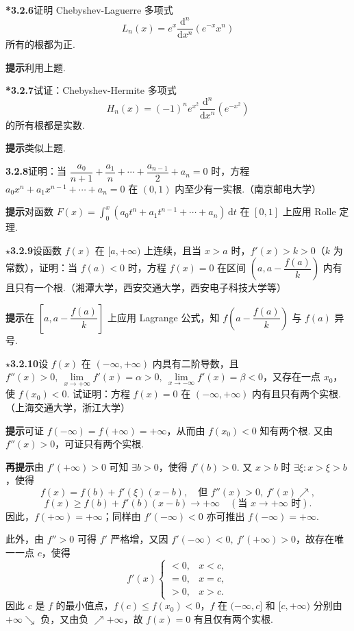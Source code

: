 \documentclass[UTF8, 12pt, fontset=fandol, oneside]{ctexart}
\begin{document}
\noindent\textbf{*3.2.6}\quad 证明 Chebyshev-Laguerre 多项式
\[
  L_n(x)=e^x\frac{\mathrm d^n}{\mathrm dx^n}(e^{-x}x^n)
\]
所有的根都为正.

\noindent\textbf{提示}\quad 利用上题.

\noindent\textbf{*3.2.7}\quad 试证：Chebyshev-Hermite 多项式
\[
  H_n(x)=(-1)^n e^{x^2}\frac{\mathrm d^n}{\mathrm dx^n}(e^{-x^2})
\]
的所有根都是实数.

\noindent\textbf{提示}\quad 类似上题.

\noindent\textbf{3.2.8}\quad 证明：当 $\dfrac{a_0}{n+1}+\dfrac{a_1}{n}+\cdots+\dfrac{a_{n-1}}2+a_n=0$ 时，方程 $a_0x^n+a_1x^{n-1}+\cdots+a_n=0$ 在 $(0,1)$ 内至少有一实根.（南京邮电大学）

\noindent\textbf{提示}\quad 对函数 $F(x)=\int_0^x(a_0t^n+a_1t^{n-1}+\cdots+a_n)\,\mathrm dt$ 在 $[0,1]$ 上应用 Rolle 定理.

\noindent\textbf{$\star$3.2.9}\quad 设函数 $f(x)$ 在 $[a,+\infty)$ 上连续，且当 $x>a$ 时，$f'(x)>k>0$（$k$ 为常数），证明：当 $f(a)<0$ 时，方程 $f(x)=0$ 在区间 $\left(a,a-\dfrac{f(a)}k\right)$ 内有且只有一个根.（湘潭大学，西安交通大学，西安电子科技大学等）

\noindent\textbf{提示}\quad 在 $\left[a,a-\dfrac{f(a)}k\right]$ 上应用 Lagrange 公式，知 $f\left(a-\dfrac{f(a)}k\right)$ 与 $f(a)$ 异号.

\noindent\textbf{$\star$3.2.10}\quad 设 $f(x)$ 在 $(-\infty,+\infty)$ 内具有二阶导数，且 $f''(x)>0,\ \lim\limits_{x\to+\infty}f'(x)=\alpha>0,\ \lim\limits_{x\to-\infty}f'(x)=\beta<0$，又存在一点 $x_0$，使 $f(x_0)<0$. 试证明：方程 $f(x)=0$ 在 $(-\infty,+\infty)$ 内有且只有两个实根.（上海交通大学，浙江大学）

\noindent\textbf{提示}\quad 可证 $f(-\infty)=f(+\infty)=+\infty$，从而由 $f(x_0)<0$ 知有两个根. 又由 $f''(x)>0$，可证只有两个实根.

\noindent\textbf{再提示}\quad 由 $f'(+\infty)>0$ 可知 $\exists b>0$，使得 $f'(b)>0$. 又 $x>b$ 时 $\exists \xi:x>\xi>b$，使得
\[
  f(x)=f(b)+f'(\xi)(x-b),
  \quad\text{但 }f''(x)>0,\ f'(x)\nearrow,
\]
\[
  f(x)\ge f(b)+f'(b)(x-b)\to+\infty\quad(\text{当 }x\to+\infty\text{ 时}).
\]
因此，$f(+\infty)=+\infty$；同样由 $f'(-\infty)<0$ 亦可推出 $f(-\infty)=+\infty$.

此外，由 $f''>0$ 可得 $f'$ 严格增，又因 $f'(-\infty)<0,\ f'(+\infty)>0$，故存在唯一一点 $c$，使得
\[
  f'(x)
  \begin{cases}
  <0,& x<c,\\
  =0,& x=c,\\
  >0,& x>c.
  \end{cases}
\]
因此 $c$ 是 $f$ 的最小值点，$f(c)\le f(x_0)<0$，$f$ 在 $(-\infty,c]$ 和 $[c,+\infty)$ 分别由 $+\infty\searrow$ 负，又由负 $\nearrow+\infty$，故 $f(x)=0$ 有且仅有两个实根.
\end{document}
